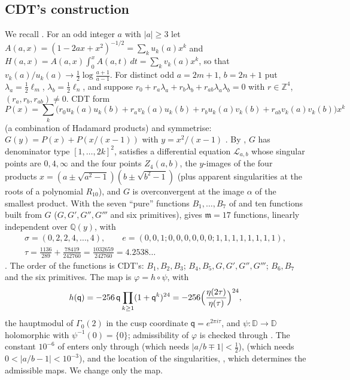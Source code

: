 \documentclass[11pt]{amsart}
\theoremstyle{definition}
\theoremstyle{remark}
\numberwithin{equation}{section}
\newcommand{\ZZ}{\mathbb{Z}}
\newcommand{\QQ}{\mathbb{Q}}
\newcommand{\DD}{\mathbb{D}}
\newcommand{\fm}{\mathfrak{m}}
\begin{document}
\subsection{CDT's construction}\label{sec:CDTconstruction}
We recall \cite[\S14]{CDT}. For an odd integer $a$ with $|a|\ge3$ let $A(a,x)=(1-2ax+x^2)^{-1/2}=\sum_ku_k(a)x^k$ and
$H(a,x)=A(a,x)\int_0^xA(a,t)\,dt=\sum_kv_k(a)x^k$, so that $v_k(a)/u_k(a)\to\frac12\log\frac{a+1}{a-1}$. For distinct
odd $a=2m+1$, $b=2n+1$ put $\lambda_a=\frac12\ell_m$, $\lambda_b=\frac12\ell_n$, and suppose
$r_0+r_a\lambda_a+r_b\lambda_b+r_{ab}\lambda_a\lambda_b=0$ with $r\in\ZZ^4$, $(r_a,r_b,r_{ab})\ne0$. CDT form
\[
P(x)=\sum_k\bigl(r_0u_k(a)u_k(b)+r_av_k(a)u_k(b)+r_bu_k(a)v_k(b)+r_{ab}v_k(a)v_k(b)\bigr)x^k
\]
(a combination of Hadamard products) and symmetrise:
$G(y)=P(x)+P(x/(x-1))$ with $y=x^2/(x-1)$ \cite[Def.~14.1.9]{CDT}. By \cite[Prop.~14.1.11]{CDT}, $G$ has denominator
type $[1,\dots,2k]^2$, satisfies a differential equation $\mathcal L_{a,b}$ whose singular points are $0,4,\infty$ and
the four points $Z_4(a,b)$, the $y$-images of the four products $x=(a\pm\sqrt{a^2-1})(b\pm\sqrt{b^2-1})$ (plus apparent
singularities at the roots of a polynomial $R_{10}$), and $G$ is overconvergent at the image $\alpha$ of the smallest
product. With the seven ``pure'' functions $B_1,\dots,B_7$ of \cite[\S10]{CDT} and ten functions built from $G$
($G,G',G'',G'''$ and six primitives), \cite[Lemma~14.3.1]{CDT} gives $\fm=17$ functions, linearly independent over
$\QQ(y)$, with
\[
\begin{gathered}
\sigma=(0,2,2,4,\dots,4),\qquad e=(0,0,1;0,0,0,0,0,0;1,1,1,1,1,1,1,1),\\
\tau=\frac{1136}{289}+\frac{78419}{242760}=\frac{1032659}{242760}=4.2538\ldots
\end{gathered}
\]
\cite[(14.5.2)--(14.5.4)]{CDT}. The order of the functions is CDT's:
$B_1,B_2,B_3$; $B_4,B_5,G,G',G'',G'''$; $B_6,B_7$ and the six primitives.
The map is $\varphi=h\circ\psi$, with
\[
h(\mathsf q)=-256\,\mathsf q\prod_{k\ge1}(1+\mathsf q^k)^{24}=-256\Bigl(\frac{\eta(2\tau)}{\eta(\tau)}\Bigr)^{24},
\]
the hauptmodul of $\Gamma_0(2)$ in the cusp coordinate $\mathsf q=e^{2\pi i\tau}$, and $\psi:\DD\to\DD$ holomorphic
with $\psi^{-1}(0)=\{0\}$; admissibility of $\varphi$ is checked through \cite[Cor.~9.0.19]{CDT}. The constant
$10^{-6}$ of \cite[Thm.~C]{CDT} enters only through \cite[Lemma~14.2.4]{CDT} (which needs $|a/b\mp1|<\frac12$),
\cite[Lemma~14.2.6]{CDT} (which needs $0<|a/b-1|<10^{-3}$), and the location of the singularities, \cite[\S14.4]{CDT},
which determines the admissible maps. We change only the map.
\end{document}
